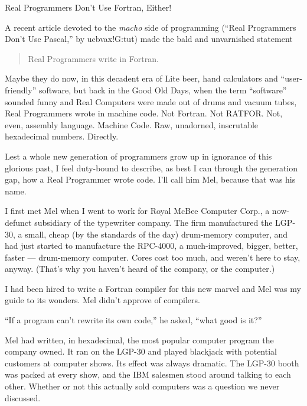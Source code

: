 \documentclass[12pt]{article}
\begin{document}
\begin{center}
Real Programmers Don't Use Fortran, Either!
\end{center}

\noindent
A recent article devoted to the {\it macho} side of programming
(``Real Programmers Don't Use Pascal,'' by ucbvax!G:tut)
made the bald and unvarnished statement

\begin{quote}
Real Programmers write in Fortran.
\end{quote}

\noindent
Maybe they do now, in this decadent era of Lite beer, hand
calculators and ``user-friendly'' software, but back in the
Good Old Days, when the term ``software'' sounded funny and
Real Computers were made out of drums and vacuum tubes, Real
Programmers wrote in machine code. Not Fortran. Not RATFOR.
Not, even, assembly language. Machine Code. Raw,
unadorned, inscrutable hexadecimal numbers. Directly.

\bigskip
\noindent
Lest a whole new generation of programmers grow up in
ignorance of this glorious past, I feel duty-bound to
describe, as best I can through the generation gap, how a
Real Programmer wrote code. I'll call him Mel, because that
was his name.

\bigskip
\noindent
I first met Mel when I went to work for Royal McBee Computer
Corp., a now-defunct subsidiary of the typewriter company.
The firm manufactured the LGP-30, a small, cheap (by the
standards of the day) drum-memory computer, and had just
started to manufacture the RPC-4000, a much-improved,
bigger, better, faster --- drum-memory computer. Cores cost
too much, and weren't here to stay, anyway. (That's why you
haven't heard of the company, or the computer.)

\bigskip
\noindent
I had been hired to write a Fortran compiler for this new
marvel and Mel was my guide to its wonders. Mel didn't
approve of compilers.

\bigskip
\noindent
``If a program can't rewrite its own code,'' he asked, ``what
good is it?''

\bigskip
\noindent
Mel had written, in hexadecimal, the most popular computer
program the company owned. It ran on the LGP-30 and played
blackjack with potential customers at computer shows. Its
effect was always dramatic. The LGP-30 booth was packed at
every show, and the IBM salesmen stood around talking to
each other. Whether or not this actually sold computers was
a question we never discussed.
\end{document}
